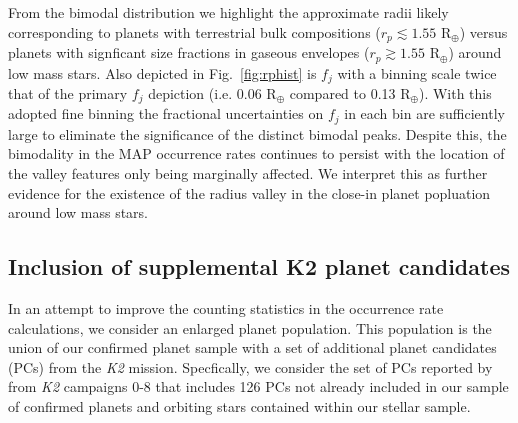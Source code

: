 \documentclass[twocolumn]{emulateapj}
\newcommand{\ktwo}[1]{\emph{K2}#1}
\begin{document}
From the bimodal distribution we highlight the approximate radii likely corresponding to planets with terrestrial
bulk compositions ($r_p\lesssim 1.55$ R$_{\oplus}$) versus planets with signficant size fractions in gaseous
envelopes ($r_p\gtrsim 1.55$ R$_{\oplus}$) around
low mass stars. Also depicted in Fig.~\ref{fig:rphist} is $f_j$ with a binning scale twice that of the primary
$f_j$ depiction (i.e. 0.06 R$_{\oplus}$ compared to 0.13 R$_{\oplus}$).
With this adopted fine binning the fractional uncertainties on $f_j$ in each bin are sufficiently
large to eliminate the significance of the distinct bimodal peaks. Despite this, the bimodality in the MAP
occurrence rates continues to persist with the location of the valley features only being marginally affected.
We interpret this as further evidence for the existence of the radius valley in the close-in planet popluation
around low mass stars. 


\subsection{Inclusion of supplemental K2 planet candidates}
In an attempt to improve the counting statistics in the occurrence rate calculations,
we consider an enlarged planet population. This population is the union of our confirmed planet sample with
a set of additional planet candidates (PCs) from the \ktwo{}
mission. Specfically, we consider the set of PCs reported by \cite{kruse19}
from \ktwo{} campaigns 0-8 that includes 126 PCs not already included in our sample of confirmed planets
and orbiting stars contained within our stellar sample.
\end{document}
